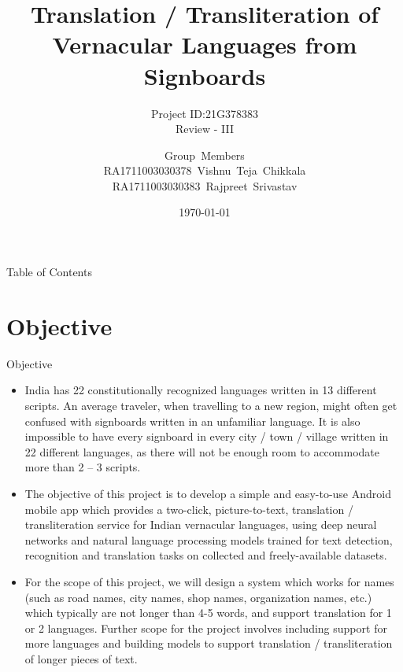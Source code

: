 \documentclass{beamer}
\title[21G378383]{Translation / Transliteration of Vernacular Languages from Signboards}
\subtitle{Project ID:21G378383\\Review - III}
\author[SRM Institute of Science \& Technology]{Group~Members\\RA1711003030378~Vishnu~Teja~Chikkala\\RA1711003030383~Rajpreet~Srivastav\\ \medskip{Supervised By:\\Mr.~Sunil~Kumar\\Assistant~Professor}}
\institute[]{Department of Computer Science \& Engineering\\Faculty of Engineering \& Technology\\SRM Institute of Science \& Technology}
\date{\today}
\begin{document}
	\begin{frame}
		\maketitle
		\date{}
	\end{frame}
	\begin{frame}[allowframebreaks]{Table of Contents} %
		\tableofcontents[sections={1-5}]
		\framebreak
		\tableofcontents[sections={6-10}]
	\end{frame}
	
\section{Objective}
\begin{frame}[allowframebreaks]{Objective}
\begin{itemize}
	\item India has 22 constitutionally recognized languages written in 13 different scripts. An average traveler, when travelling to a new region, might often get confused with signboards written in an unfamiliar language. It is also impossible to have every signboard in every city / town / village written in 22 different languages, as there will not be enough room to accommodate more than 2 – 3 scripts.
	\item The objective of this project is to develop a simple and easy-to-use Android mobile app which provides a two-click, picture-to-text, translation / transliteration service for Indian vernacular languages, using deep neural networks and natural language processing models trained for text detection, recognition and translation tasks on collected and freely-available datasets.
	\item For the scope of this project, we will design a system which works for names (such as road names, city names, shop names, organization names, etc.) which typically are not longer than 4-5 words, and support translation for 1 or 2 languages. Further scope for the project involves including support for more languages and building models to support translation / transliteration of longer pieces of text.
\end{itemize}
\end{frame}
\end{document}
